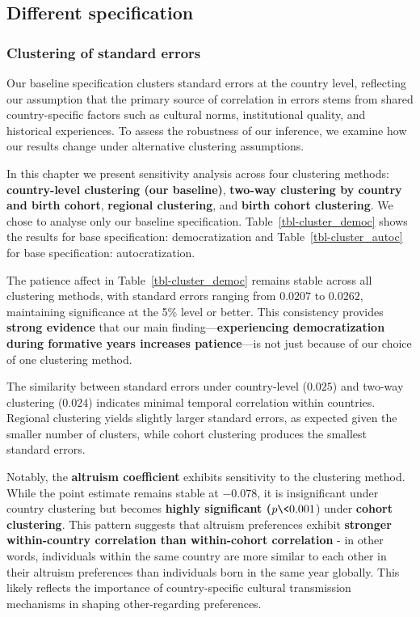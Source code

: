 \documentclass[
  letterpaper,
  DIV=11,
  numbers=noendperiod]{scrartcl}
\begin{document}
\hypertarget{different-specification}{%
\subsection{Different specification}\label{different-specification}}

\hypertarget{clustering-of-standard-errors}{%
\subsubsection{Clustering of standard
errors}\label{clustering-of-standard-errors}}

Our baseline specification clusters standard errors at the country
level, reflecting our assumption that the primary source of correlation
in errors stems from shared country-specific factors such as cultural
norms, institutional quality, and historical experiences. To assess the
robustness of our inference, we examine how our results change under
alternative clustering assumptions.

In this chapter we present sensitivity analysis across four clustering
methods: \textbf{country-level clustering (our baseline)},
\textbf{two-way clustering by country and birth cohort},
\textbf{regional clustering}, and \textbf{birth cohort clustering}. We
chose to analyse only our baseline specification.
Table~\ref{tbl-cluster_democ} shows the results for base specification:
democratization and Table~\ref{tbl-cluster_autoc} for base
specification: autocratization.

The patience affect in Table~\ref{tbl-cluster_democ} remains stable
across all clustering methods, with standard errors ranging from
\(0.0207\) to \(0.0262\), maintaining significance at the 5\% level or
better. This consistency provides \textbf{strong evidence} that our main
finding---\textbf{experiencing democratization during formative years
increases patience}---is not just because of our choice of one
clustering method.

The similarity between standard errors under country-level (\(0.025\))
and two-way clustering (\(0.024\)) indicates minimal temporal
correlation within countries. Regional clustering yields slightly larger
standard errors, as expected given the smaller number of clusters, while
cohort clustering produces the smallest standard errors.

Notably, the \textbf{altruism coefficient} exhibits sensitivity to the
clustering method. While the point estimate remains stable at
\(-0.078\), it is insignificant under country clustering but becomes
\textbf{highly significant (}\(p \< 0.001\)) under \textbf{cohort
clustering}. This pattern suggests that altruism preferences exhibit
\textbf{stronger within-country correlation than within-cohort
correlation} - in other words, individuals within the same country are
more similar to each other in their altruism preferences than
individuals born in the same year globally. This likely reflects the
importance of country-specific cultural transmission mechanisms in
shaping other-regarding preferences.
\end{document}
